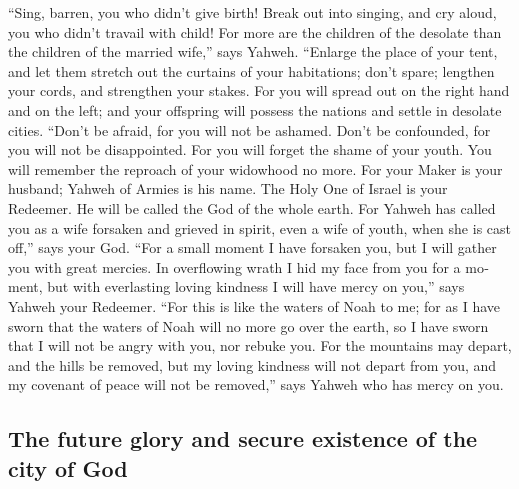 \begin{paracol}{2}
\begin{otherlanguage}{english}
 ``Sing, barren, you who didn't give birth! Break out into
singing, and cry aloud, you who didn't travail with child! For more are
the children of the desolate than the children of the married wife,''
says Yahweh.  ``Enlarge the place of your tent, and let
them stretch out the curtains of your habitations; don't spare; lengthen
your cords, and strengthen your stakes.  For you will
spread out on the right hand and on the left; and your offspring will
possess the nations and settle in desolate cities. 
``Don't be afraid, for you will not be ashamed. Don't be confounded, for
you will not be disappointed. For you will forget the shame of your
youth. You will remember the reproach of your widowhood no more.
 For your Maker is your husband; Yahweh of Armies is his
name. The Holy One of Israel is your Redeemer. He will be called the God
of the whole earth.  For Yahweh has called you as a wife
forsaken and grieved in spirit, even a wife of youth, when she is cast
off,'' says your God.  ``For a small moment I have
forsaken you, but I will gather you with great mercies. 
In overflowing wrath I hid my face from you for a moment, but with
everlasting loving kindness I will have mercy on you,'' says Yahweh your
Redeemer.  ``For this is like the waters of Noah to me;
for as I have sworn that the waters of Noah will no more go over the
earth, so I have sworn that I will not be angry with you, nor rebuke
you.  For the mountains may depart, and the hills be
removed, but my loving kindness will not depart from you, and my
covenant of peace will not be removed,'' says Yahweh who has mercy on
you.

\hypertarget{the-future-glory-and-secure-existence-of-the-city-of-god}{%
\subsection{The future glory and secure existence of the city of
God}\label{the-future-glory-and-secure-existence-of-the-city-of-god}}


\end{otherlanguage}
\end{paracol}
